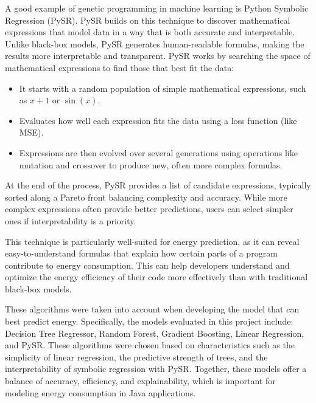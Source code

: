 A good example of genetic programming in machine learning is Python Symbolic Regression (PySR). PySR builds on this technique to discover mathematical expressions that model data in a way that is both accurate and interpretable. Unlike black-box models, PySR generates human-readable formulas, making the results more interpretable and transparent.
PySR works by searching the space of mathematical expressions to find those that best fit the data:

\begin{itemize}
    \item It starts with a random population of simple mathematical expressions, such as $x + 1$ or $\sin(x)$.
    \item Evaluates how well each expression fits the data using a loss function (like MSE).
    \item Expressions are then evolved over several generations using operations like mutation and crossover to produce new, often more complex formulas.
\end{itemize}

At the end of the process, PySR provides a list of candidate expressions, typically sorted along a Pareto front balancing complexity and accuracy. While more complex expressions often provide better predictions, users can select simpler ones if interpretability is a priority.

This technique is particularly well-suited for energy prediction, as it can reveal easy-to-understand formulas that explain how certain parts of a program contribute to energy consumption. This can help developers understand and optimize the energy efficiency of their code more effectively than with traditional black-box models.

These algorithms were taken into account when developing the model that can best predict energy.
Specifically, the models evaluated in this project include: Decision Tree Regressor, Random Forest, Gradient Boosting, Linear Regression, and PySR. These algorithms were chosen based on characteristics such as the simplicity of linear regression, the predictive strength of trees, and the interpretability of symbolic regression with PySR. Together, these models offer a balance of accuracy, efficiency, and explainability, which is important for modeling energy consumption in Java applications.


